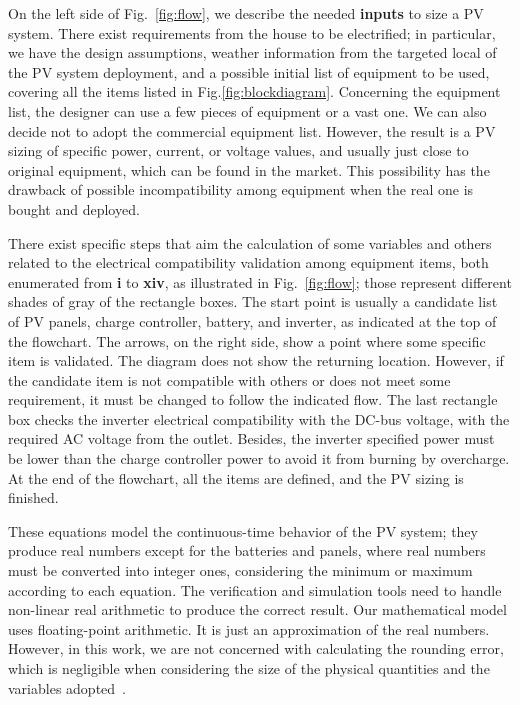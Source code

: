 \documentclass[10pt,journal,compsoc]{IEEEtran}
\begin{document}
On the left side of Fig.~\ref{fig:flow}, we describe the needed \textbf{inputs} to size a PV system. There exist requirements from the house to be electrified; in particular, we have the design assumptions, weather information from the targeted local of the PV system deployment, and a possible initial list of equipment to be used, covering all the items listed in Fig.\ref{fig:blockdiagram}. Concerning the equipment list, the designer can use a few pieces of equipment or a vast one. We can also decide not to adopt the commercial equipment list. However, the result is a PV sizing of specific power, current, or voltage values, and usually just close to original equipment, which can be found in the market. This possibility has the drawback of possible incompatibility among equipment when the real one is bought and deployed.

There exist specific steps that aim the calculation of some variables and others related to the electrical compatibility validation among equipment items, both enumerated from \textbf{i} to \textbf{xiv}, as illustrated in Fig.~\ref{fig:flow}; those represent different shades of gray of the rectangle boxes. The start point is usually a candidate list of PV panels, charge controller, battery, and inverter, as indicated at the top of the flowchart. The arrows, on the right side, show a point where some specific item is validated. The diagram does not show the returning location. However, if the candidate item is not compatible with others or does not meet some requirement, it must be changed to follow the indicated flow. The last rectangle box checks the inverter electrical compatibility with the DC-bus voltage, with the required AC voltage from the outlet. Besides, the inverter specified power must be lower than the charge controller power to avoid it from burning by overcharge. At the end of the flowchart, all the items are defined, and the PV sizing is finished.

These equations model the continuous-time behavior of the PV system; they produce real numbers except for the batteries and panels, where real numbers must be converted into integer ones, considering the minimum or maximum according to each equation. The verification and simulation tools need to handle non-linear real arithmetic to produce the correct result. Our mathematical model uses floating-point arithmetic. It is just an approximation of the real numbers. However, in this work, we are not concerned with calculating the rounding error, which is negligible when considering the size of the physical quantities and the variables adopted~\cite{DBLP:journals/corr/abs-2004-12699}.
\end{document}
